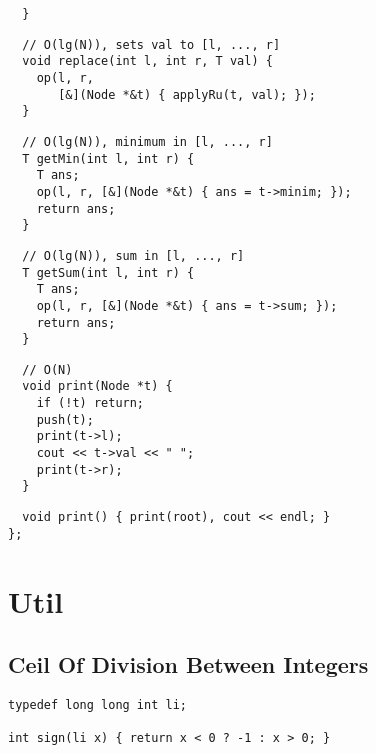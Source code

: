 \documentclass[twoside]{article}
\newcommand{\fileTitleStyle}{\large\underline}
\begin{document}
\begin{multicols*}{2}
\begin{verbatim}
  }
\end{verbatim}
\vspace{-12pt}
\begin{verbatim}
  // O(lg(N)), sets val to [l, ..., r]
  void replace(int l, int r, T val) {
    op(l, r,
       [&](Node *&t) { applyRu(t, val); });
  }
\end{verbatim}
\vspace{-12pt}
\begin{verbatim}
  // O(lg(N)), minimum in [l, ..., r]
  T getMin(int l, int r) {
    T ans;
    op(l, r, [&](Node *&t) { ans = t->minim; });
    return ans;
  }
\end{verbatim}
\vspace{-12pt}
\begin{verbatim}
  // O(lg(N)), sum in [l, ..., r]
  T getSum(int l, int r) {
    T ans;
    op(l, r, [&](Node *&t) { ans = t->sum; });
    return ans;
  }
  \end{verbatim}
\vspace{-12pt}
\begin{verbatim}
  // O(N)
  void print(Node *t) {
    if (!t) return;
    push(t);
    print(t->l);
    cout << t->val << " ";
    print(t->r);
  }
\end{verbatim}
\vspace{-12pt}
\begin{verbatim}
  void print() { print(root), cout << endl; }
};
\end{verbatim}

\sectionfont{\centering\bfseries\Huge}
\vspace{1em}
\section*{Util}
\vspace{3em}
\subsectionfont{\centering\bfseries\LARGE}
\subsectionfont{\fileTitleStyle}
\subsection*{Ceil Of Division Between Integers}
\begin{verbatim}
typedef long long int li;

int sign(li x) { return x < 0 ? -1 : x > 0; }


\end{verbatim}
\end{multicols*}
\end{document}

